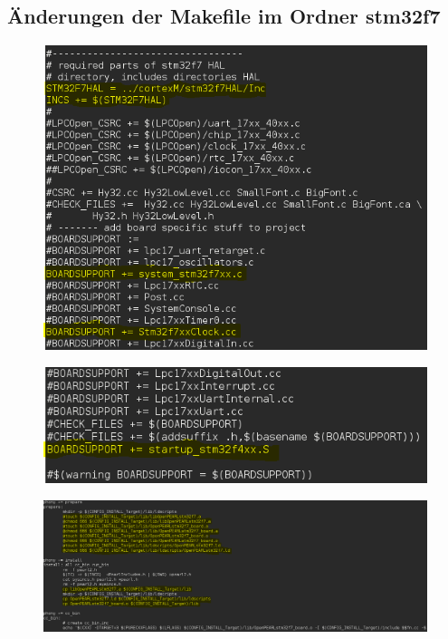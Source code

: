 \subsection{Änderungen der Makefile im Ordner stm32f7}\label{Änderungen der Makefile im Ordner stm32f7}
\begin{figure}[h]
\begin{center}
\includegraphics[width=13cm]{grafiken/Makefile_stm32f7_1.png}
\end{center}
\end{figure}

\begin{figure}[h]
\begin{center}
\includegraphics[width=13cm]{grafiken/Makefile_stm32f7_2.png}
\end{center}
\end{figure}
\newpage

\begin{figure}[h]
\begin{center}
\includegraphics[width=35cm]{grafiken/Makefile_stm32f7_3.png}
\end{center}
\end{figure}

